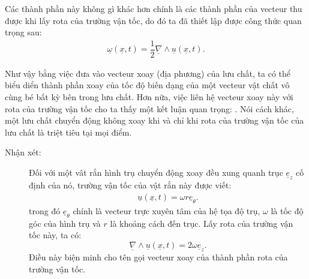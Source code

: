 \documentclass[../../../main.tex]{subfiles}
\begin{document}
	Các thành phần này không gì khác hơn chính là các thành phần của vecteur thu được khi lấy rota của trường vận tốc, do đó ta đã thiết lập được công thức quan trọng sau:
		\begin{align}
			\boxed{\underline{\omega}\left(\underline{x},t\right)=\dfrac{1}{2}\underline{\nabla}\wedge\underline{u}\left(\underline{x},t\right)}.
		\end{align}

	Như vậy bằng việc đưa vào vecteur xoay (địa phương) của lưu chất, ta có thể biểu diển thành phần xoay của tốc độ biến dạng của một vecteur vật chất vô cùng bé bất kỳ bên trong lưu chất. Hơn nữa, việc liên hệ vecteur xoay này với rota của trường vận tốc cho ta thấy một kết luận quan trọng: . Nói cách khác, một lưu chất chuyển động không xoay khi và chỉ khi rota của trường vận tốc của lưu chất là triệt tiêu tại mọi điểm.
	\begin{description}
		\item[Nhận xét:] Đối với một vât rắn hình trụ chuyển động xoay đều xung quanh trục $\underline{e}_z$ cố định của nó, trường vận tốc của vật rắn này được viết:
			\begin{align}
				\underline{u}\left(\underline{x},t\right)=\omega r\underline{e}_\theta.
			\end{align}
		trong đó $\underline{e}_\theta$ chính là vecteur trực xuyên tâm của hệ tọa độ trụ, $\omega$ là tốc độ góc của hình trụ và $r$ là khoảng cách đến trục. Lấy rota của trường vận tốc này, ta có:
			\[
				\underline{\nabla}\wedge\underline{u}\left(\underline{x},t\right)=2\omega\underline{e}_z.
			\]
		Điều này biện minh cho tên gọi vecteur xoay của thành phần rota của trường vận tốc.
	\end{description}
\end{document}
